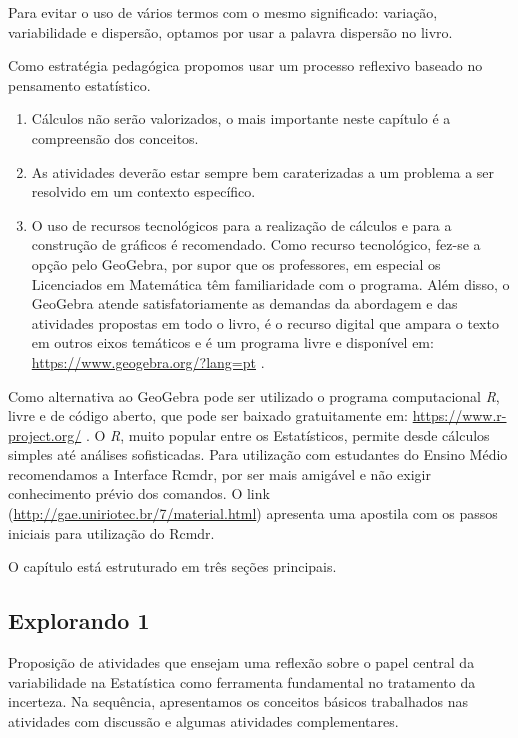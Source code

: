 \begin{apresentacao}
Para evitar o uso de vários termos com o mesmo significado: variação, variabilidade e dispersão, optamos por usar a palavra dispersão no livro.

Como estratégia pedagógica propomos usar um processo reflexivo baseado no pensamento estatístico.
\begin{enumerate}
\item {} 
Cálculos não serão valorizados, o mais importante neste capítulo é a compreensão dos conceitos.

\item {} 
As atividades deverão estar sempre bem caraterizadas a um problema a ser resolvido em um contexto específico.

\item {} 
O uso de recursos tecnológicos para a realização de cálculos e para a construção de gráficos é recomendado. Como recurso tecnológico, fez-se a opção pelo GeoGebra, por supor que os professores, em especial os Licenciados em Matemática têm familiaridade com o programa. Além disso, o GeoGebra atende satisfatoriamente as demandas da abordagem e das atividades propostas em todo o livro, é o recurso digital que ampara o texto em outros eixos temáticos e é um programa livre e disponível em: \url{https://www.geogebra.org/?lang=pt} .

\end{enumerate}

Como alternativa ao GeoGebra pode ser utilizado o programa computacional \textit{R}, livre e de código aberto, que pode ser baixado gratuitamente em: \url{https://www.r-project.org/} . O \textit{R}, muito popular entre os Estatísticos, permite desde cálculos simples até análises sofisticadas. Para utilização com estudantes do Ensino Médio recomendamos a Interface Rcmdr, por ser mais amigável e não exigir conhecimento prévio dos comandos. O link (\url{http://gae.uniriotec.br/7/material.html}) apresenta uma apostila com os passos iniciais para utilização do Rcmdr.

O capítulo está estruturado em três seções principais.


\subsection{Explorando 1} Proposição de atividades que ensejam uma reflexão sobre o papel central da variabilidade na Estatística como ferramenta fundamental no tratamento da incerteza. Na sequência,  apresentamos os conceitos básicos trabalhados nas atividades com discussão e algumas atividades complementares.


\end{apresentacao}
